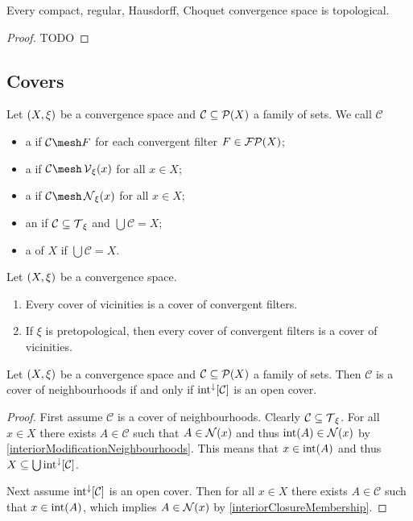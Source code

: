 \begin{proposition}
Every compact, regular, Hausdorff, Choquet convergence space is topological.
\end{proposition}
\begin{proof}
TODO
\end{proof}

\subsection{Covers}
\begin{definition}
Let $\left( X,\xi \right)$ be a convergence space and $\mathcal{C}\subseteq \operatorname{\mathcal{P}}(X)$ a family of sets. We call $\mathcal{C}$ 
\begin{itemize}
\item a  if $\mathcal{C}\mesh F$ for each convergent filter $F\in\operatorname{\mathcal{FP}}(X)$;
\item a  if $\mathcal{C}\mesh \vicinity_\xi(x)$ for all $x\in X$;
\item a  if $\mathcal{C}\mesh \neighbourhood_\xi(x)$ for all $x\in X$;
\item an  if $\mathcal{C} \subseteq \operatorname{\mathcal{T}}_\xi$ and $\bigcup \mathcal{C} = X$;
\item a  of $X$ if $\bigcup \mathcal{C} = X$.
\end{itemize}
\end{definition}

\begin{lemma}
Let $\left( X,\xi \right)$ be a convergence space.
\begin{enumerate}
\item Every cover of vicinities is a cover of convergent filters.
\item If $\xi$ is pretopological, then every cover of convergent filters is a cover of vicinities.
\end{enumerate}
\end{lemma}

\begin{lemma}
Let $\left( X,\xi \right)$ be a convergence space and $\mathcal{C}\subseteq \operatorname{\mathcal{P}}(X)$ a family of sets. Then $\mathcal{C}$ is a cover of neighbourhoods \textup{if and only if} $\operatorname{int}^\downarrow[\mathcal{C}]$ is an open cover.
\end{lemma}
\begin{proof}
First assume $\mathcal{C}$ is a cover of neighbourhoods. Clearly $\mathcal{C} \subseteq \operatorname{\mathcal{T}}_\xi$. For all $x\in X$ there exists $A\in \mathcal{C}$ such that $A\in \operatorname{\mathcal{N}}(x)$ and thus $\operatorname{int}(A) \in \operatorname{\mathcal{N}}(x)$ by \ref{interiorModificationNeighbourhoods}. This means that $x\in \operatorname{int}(A)$ and thus $X\subseteq \bigcup\operatorname{int}^\downarrow[\mathcal{C}]$.

Next assume $\operatorname{int}^\downarrow[\mathcal{C}]$ is an open cover. Then for all $x\in X$ there exists $A\in \mathcal{C}$ such that $x\in \operatorname{int}(A)$, which implies $A\in \operatorname{\mathcal{N}}(x)$ by \ref{interiorClosureMembership}.
\end{proof}


